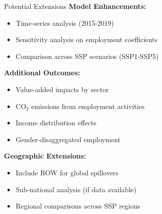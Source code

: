 \documentclass[10pt]{beamer}
\begin{document}
\begin{frame}{Potential Extensions}
\textbf{Model Enhancements:}
\begin{itemize}
    \item Time-series analysis (2015-2019)
    \item Sensitivity analysis on employment coefficients
    \item Comparison across SSP scenarios (SSP1-SSP5)
\end{itemize}

\vspace{0.3cm}

\textbf{Additional Outcomes:}
\begin{itemize}
    \item Value-added impacts by sector
    \item CO$_2$ emissions from employment activities
    \item Income distribution effects
    \item Gender-disaggregated employment
\end{itemize}

\vspace{0.3cm}

\textbf{Geographic Extensions:}
\begin{itemize}
    \item Include ROW for global spillovers
    \item Sub-national analysis (if data available)
    \item Regional comparisons across SSP regions
\end{itemize}
\end{frame}

\end{document}
